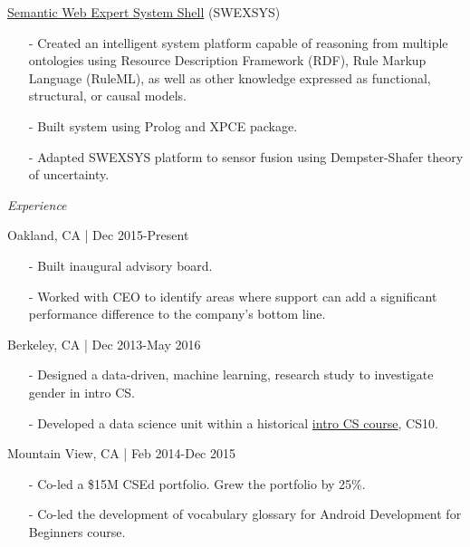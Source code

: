 \documentclass[11pt,article,oneside]{memoir}
\begin{document}
\ind \href{https://github.com/omoju/SWEXSYS}{Semantic Web Expert System Shell} (SWEXSYS)
\begin{itemize}[noitemsep,nolistsep]
\item[-] Created an intelligent system platform capable of reasoning from multiple ontologies using Resource Description Framework (RDF), Rule Markup Language (RuleML), as well as other knowledge expressed as functional, structural, or causal models.
\item[-] Built system using Prolog and XPCE package.
\item[-] Adapted SWEXSYS platform to sensor fusion using Dempster-Shafer theory of uncertainty.
\end{itemize} 

\bigskip 
  
\medskip

\noindent\emph{Experience \vspace{0.05in}}


 \hfill Oakland, CA | Dec 2015-Present
\begin{itemize}[noitemsep,nolistsep]
\item[-]Built inaugural advisory board.
\item[-]Worked with CEO to identify areas where support can add a significant performance difference to the company's bottom line.
\end{itemize} 

 \hfill Berkeley, CA | Dec 2013-May 2016
\begin{itemize}[noitemsep,nolistsep]
\item[-] Designed a data-driven, machine learning, research study to investigate gender in intro CS. 
\item[-] Developed a data science unit within a historical \href{http://www.whitehouse.gov/the-press-office/2014/12/08/fact-sheet-new-commitments-support-computer-science-education}{intro CS course}, CS10.\\
\end{itemize} 

 \hfill Mountain View, CA | Feb 2014-Dec 2015 
\begin{itemize}[noitemsep,nolistsep]
\item[-]Co-led a \$15M CSEd portfolio. Grew the portfolio by 25\%.
\item[-]Co-led the development of vocabulary glossary for Android Development for Beginners course.
\end{itemize} 
\end{document}
